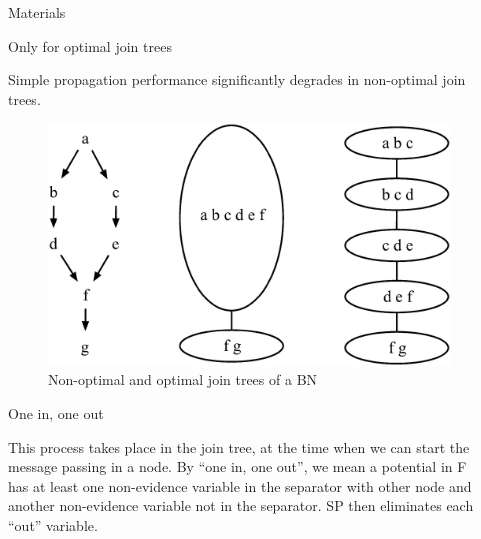 \documentclass[final]{beamer}
\newlength{\onecolwid}
\newlength{\twocolwid}
\begin{document}
\begin{frame}[t]
\begin{columns}[t]
\begin{column}{\twocolwid}
\begin{columns}[t,totalwidth=\twocolwid]
\begin{column}{\onecolwid}
\begin{block}{Materials}
\end{block}

\begin{alertblock}{Only for optimal join trees}

Simple propagation performance significantly degrades in non-optimal join trees. 

\end{alertblock} 

\begin{figure}
\includegraphics[width=0.8\linewidth]{optimal.png}
\caption{Non-optimal and optimal join trees of a BN}
\end{figure}

\begin{block}{One in, one out}

This process takes place in the join tree, at the time when we can start the message passing in a node. By “one in, one out”, we mean a potential in F has at least one non-evidence variable in the separator with other node and another non-evidence variable not in the separator. SP then eliminates
each “out” variable. 



\end{block}


\end{column} %

\begin{column}{\onecolwid}\vspace{-.6in} %



\end{column}
\end{columns}
\end{column}
\end{columns}
\end{frame}
\end{document}
